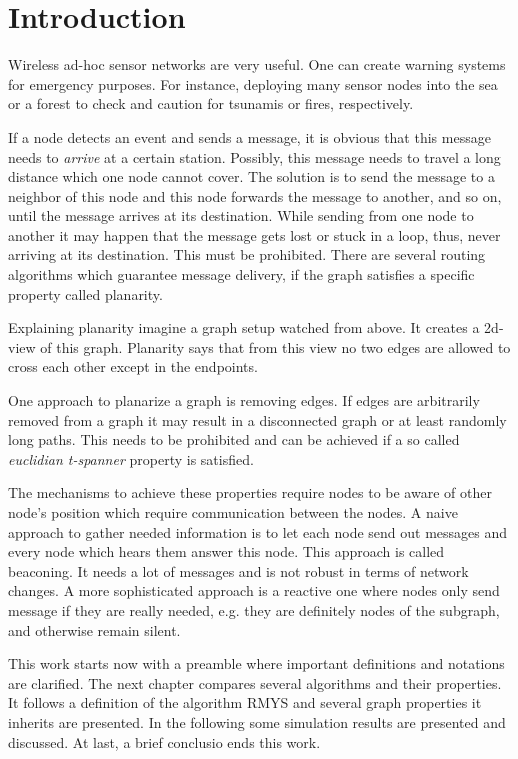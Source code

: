 \section{Introduction}
Wireless ad-hoc sensor networks are very useful. 
One can create warning systems for emergency purposes.
For instance, deploying many sensor nodes into the sea or a forest to check and caution for tsunamis or fires, respectively.

If a node detects an event and sends a message, it is obvious that this message needs to \emph{arrive} at a certain station.
Possibly, this message needs to travel a long distance which one node cannot cover.
The solution is to send the message to a neighbor of this node and this node forwards the message to another, and so on, until the message arrives at its destination.
While sending from one node to another it may happen that the message gets lost or stuck in a loop, thus, never arriving at its destination.
This must be prohibited.
There are several routing algorithms which guarantee message delivery, if the graph satisfies a specific property called planarity.

Explaining planarity imagine a graph setup watched from above. 
It creates a 2d-view of this graph.
Planarity says that from this view no two edges are allowed to cross each other except in the endpoints.

One approach to planarize a graph is removing edges.
If edges are arbitrarily removed from a graph it may result in a disconnected graph or at least randomly long paths.
This needs to be prohibited and can be achieved if a so called \emph{euclidian t-spanner} property is satisfied.

The mechanisms to achieve these properties require nodes to be aware of other node's position which require communication between the nodes.
A naive approach to gather needed information is to let each node send out messages and every node which hears them answer this node.
This approach is called beaconing.
It needs a lot of messages and is not robust in terms of network changes.
A more sophisticated approach is a reactive one where nodes only send message if they are really needed, e.g. they are definitely nodes of the subgraph, and otherwise remain silent. 

This work starts now with a preamble where important definitions and notations are clarified.
The next chapter compares several algorithms and their properties.
It follows a definition of the algorithm RMYS and several graph properties it inherits are presented.
In the following some simulation results are presented and discussed.
At last, a brief conclusio ends this work.